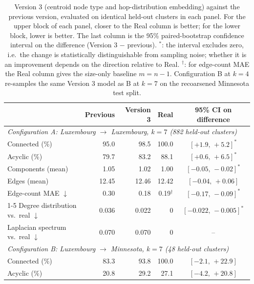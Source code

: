 \begin{table}[t]
\centering
\caption{Version 3 (centroid node type and hop-distribution embedding) against
the previous version, evaluated on identical held-out clusters in each panel.
For the upper block of each panel, closer to the Real column is better; for the
lower block, lower is better. The last column is the 95\% paired-bootstrap
confidence interval on the difference (Version 3 $-$ previous). $^\ast$: the
interval excludes zero, i.e.\ the change is statistically distinguishable from
sampling noise; whether it is an improvement depends on the direction relative
to Real. $^\dagger$: for edge-count MAE the Real column gives the size-only
baseline $m = n - 1$. Configuration B at $k = 4$ re-samples the same Version 3
model as B at $k = 7$ on the recoarsened Minnesota test split.}
\label{tab:v3}
\begin{tabular}{lrrrc}
\toprule
& Previous & Version 3 & Real & 95\% CI on difference \\
\midrule
\multicolumn{5}{l}{\emph{Configuration A: Luxembourg $\rightarrow$ Luxembourg, $k = 7$ (882 held-out clusters)}} \\
\midrule
Connected (\%)                                 &    95.0 &    98.5 &     100.0 & $[+1.9,\,+5.2]^\ast$ \\
Acyclic (\%)                                   &    79.7 &    83.2 &      88.1 & $[+0.6,\,+6.5]^\ast$ \\
Components (mean)                              &    1.05 &    1.02 &      1.00 & $[-0.05,\,-0.02]^\ast$ \\
Edges (mean)                                   &   12.45 &   12.46 &     12.42 & $[-0.04,\,+0.06]$ \\
Edge-count MAE $\downarrow$                    &    0.30 &    0.18 & 0.19$^\dagger$ & $[-0.17,\,-0.09]^\ast$ \\
\cmidrule(lr){1-5}
Degree distribution vs.\ real $\downarrow$     &   0.036 &   0.022 &         0 & $[-0.022,\,-0.005]^\ast$ \\
Laplacian spectrum vs.\ real $\downarrow$      &   0.070 &   0.070 &         0 & -- \\
\midrule
\multicolumn{5}{l}{\emph{Configuration B: Luxembourg $\rightarrow$ Minnesota, $k = 7$ (48 held-out clusters)}} \\
\midrule
Connected (\%)                                 &    83.3 &    93.8 &     100.0 & $[-2.1,\,+22.9]$ \\
Acyclic (\%)                                   &    20.8 &    29.2 &      27.1 & $[-4.2,\,+20.8]$ \\

\end{tabular}
\end{table}
